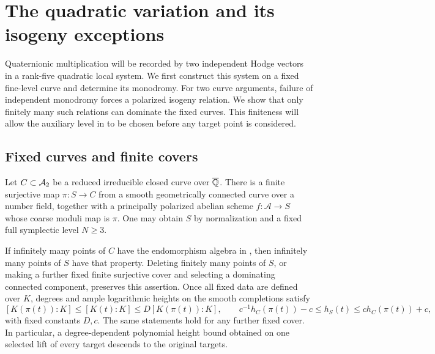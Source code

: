 \section{The quadratic variation and its isogeny exceptions}
\label{sec:geometry}

Quaternionic multiplication will be recorded by two independent Hodge
vectors in a rank-five quadratic local system.  We first construct this
system on a fixed fine-level curve and determine its monodromy.  For two
curve arguments, failure of independent monodromy forces a polarized
isogeny relation.  We show that only finitely many such relations can
dominate the fixed curves.  This finiteness will allow the auxiliary level
in  to be chosen before any target point is considered.

\subsection{Fixed curves and finite covers}

\begin{lemma}\label{lem:finite-covers}
Let $C\subset\mathcal A_2$ be a reduced irreducible closed curve over $\overline{\mathbb Q}$.
There is a finite surjective map $\pi:S\to C$ from a smooth geometrically
connected curve over a number field, together with a principally polarized abelian scheme
$f:\mathcal A\to S$ whose coarse moduli map is $\pi$.  One may obtain $S$
by normalization and a fixed full symplectic level $N\geq3$.

If infinitely many points of $C$ have the endomorphism algebra in
, then infinitely many points of $S$ have that property.
Deleting finitely many points of $S$, or making a further fixed finite
surjective cover and selecting a dominating connected component, preserves
this assertion.  Once all fixed data are defined over $K$, degrees and ample
logarithmic heights on the smooth completions satisfy
\begin{equation}\label{eq:fixed-cover-bounds}
 [K(\pi(t)):K]\leq[K(t):K]\leq D[K(\pi(t)):K],\qquad
 c^{-1}h_C(\pi(t))-c\leq h_S(t)\leq c h_C(\pi(t))+c,
\end{equation}
with fixed constants $D,c$.  The same statements hold for any further fixed
cover.  In particular, a degree-dependent polynomial height bound obtained
on one selected lift of every target descends to the original targets.
\end{lemma}

